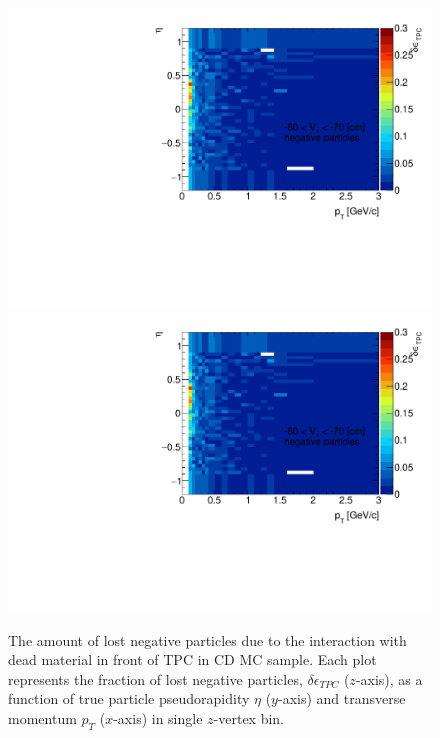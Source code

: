 \begin{figure}[H]
	\caption[The amount of lost negative particles due to the interaction with dead material in front of TPC as a function of $p_T$, $\eta$ and $z$-vertex in CD]{The amount of lost negative particles due to the interaction with dead material in front of TPC in CD MC sample. Each plot represents the fraction of lost negative particles, $\delta\epsilon_{ TPC}$ ($z$-axis), as a function of true particle pseudorapidity $\eta$ ($y$-axis) and transverse momentum $p_{T}$ ($x$-axis) in single $z$-vertex bin.}\label{fig:dead_materialCD3Dnegative}
	\parbox{0.325\textwidth}{
		\includegraphics[width=\linewidth,page=1]{graphics/systematicsEfficiency/deadMaterial/secondaries_Unbinned_Charged_CD.pdf}\\
		\includegraphics[width=\linewidth,page=4]{graphics/systematicsEfficiency/deadMaterial/secondaries_Unbinned_Charged_CD.pdf}\\
}
\end{figure}
